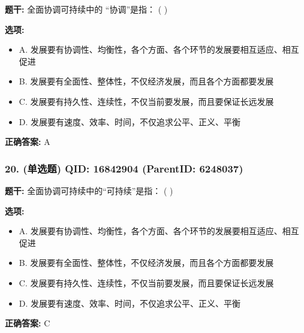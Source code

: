 \documentclass[12pt,UTF8]{ctexart}
\begin{document}
\textbf{题干:}
全面协调可持续中的 “协调”是指： ( )



\textbf{选项:}
\begin{itemize}[leftmargin=*]

  \item A. 发展要有协调性、均衡性，各个方面、各个环节的发展要相互适应、相互促进

  \item B. 发展要有全面性、整体性，不仅经济发展，而且各个方面都要发展

  \item C. 发展要有持久性、连续性，不仅当前要发展，而且要保证长远发展

  \item D. 发展要有速度、效率、时间，不仅追求公平、正义、平衡

\end{itemize}

\textbf{正确答案:}
A

\vspace{0.3em}\hrulefill\vspace{0.7em}

\subsubsection*{20. (单选题) \small QID: 16842904 (ParentID: 6248037)}

\textbf{题干:}
全面协调可持续中的“可持续”是指： ( )



\textbf{选项:}
\begin{itemize}[leftmargin=*]

  \item A. 发展要有协调性、均衡性，各个方面、各个环节的发展要相互适应、相互促进

  \item B. 发展要有全面性、整体性，不仅经济发展，而且各个方面都要发展

  \item C. 发展要有持久性、连续性，不仅当前要发展，而且要保证长远发展

  \item D. 发展要有速度、效率、时间，不仅追求公平、正义、平衡

\end{itemize}

\textbf{正确答案:}
C

\vspace{0.3em}\hrulefill\vspace{0.7em}
\end{document}
